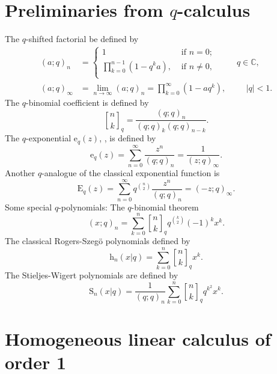\documentclass[12pt]{article}
\newcommand{\qbinom}{\genfrac{[}{]}{0pt}{}}
\newcommand{\C}{\mathbb{C}}
\newcommand{\E}{\mathrm{E}}
\newcommand{\e}{\mathrm{e}}
\newcommand{\h}{\mathrm{h}}
\newcommand{\s}{\mathrm{S}}
\begin{document}
\section{Preliminaries from $q$-calculus} 

The $q$-shifted factorial be defined by
\begin{align*}
    (a;q)_{n}&=\begin{cases}
        1&\text{ if }n=0;\\
    \prod_{k=0}^{n-1}(1-q^{k}a),&\text{ if }n\neq0,\\
    \end{cases}\hspace{1cm}q\in\C,\\
    (a;q)_{\infty}&=\lim_{n\rightarrow\infty}(a;q)_{n}=\prod_{k=0}^{\infty}(1-aq^{k}),\hspace{1cm} \vert q\vert<1.
\end{align*}
The $q$-binomial coefficient is defined by
\begin{equation*}
\qbinom{n}{k}_{q}=\frac{(q;q)_{n}}{(q;q)_{k}(q;q)_{n-k}}.
\end{equation*}
The $q$-exponential $\e_{q}(z)$, \cite{euler,kac}, is defined by
\begin{equation*}
    \e_{q}(z)=\sum_{n=0}^{\infty}\frac{z^n}{(q;q)_{n}}=\frac{1}{(z;q)_{\infty}}.
\end{equation*}
Another $q$-analogue of the classical exponential function is
\begin{equation*}
    \E_{q}(z)=\sum_{n=0}^{\infty}q^{\binom{n}{2}}\frac{z^n}{(q;q)_{n}}=(-z;q)_{\infty}.
\end{equation*}
Some special $q$-polynomials: The $q$-binomial theorem
\begin{equation}\label{eqn_gauss}
    (x;q)_{n}=\sum_{k=0}^{n}\qbinom{n}{k}_{q}q^{\binom{k}{2}}(-1)^kx^k.
\end{equation}
The classical Rogers-Szeg\"o polynomials defined by
\begin{equation}\label{eqn_rs}
    \h_{n}(x|q)=\sum_{k=0}^{n}\qbinom{n}{k}_{q}x^k.
\end{equation}
The Stieljes-Wigert polynomials are defined by
\begin{equation}\label{eqn_sw}
    \s_{n}(x|q)=\frac{1}{(q;q)_{n}}\sum_{k=0}^{n}\qbinom{n}{k}_{q}q^{k^2}x^k.
\end{equation}



\section{Homogeneous linear calculus of order 1}\label{sec3}
\end{document}
